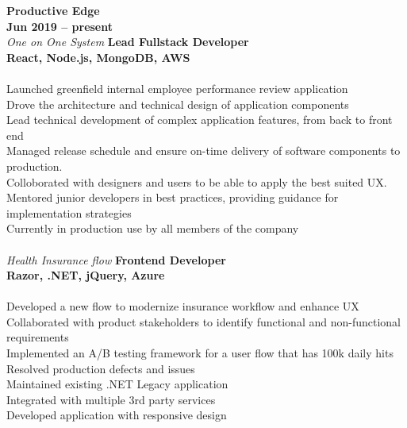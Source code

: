 \documentclass[margin,line]{resume}
\begin{document}
\begin{resume}
    \textbf{\listing Productive Edge} \vspace{2mm}\\\vspace{1mm} \hfill \textbf{Jun 2019 -- present}\\
    \textsl{One on One System}  \hfill \textbf{Lead Fullstack Developer}\\
    \mbox{} \hfill \textbf{React, Node.js, MongoDB, AWS}\\\\
    Launched greenfield internal employee performance review application\\
    Drove the architecture and technical design of application components\\
    Lead technical development of complex application features, from back to front end\\
    Managed release schedule and ensure on-time delivery of software components to production.\\
    Colloborated with designers and users to be able to apply the best suited UX.\\
    Mentored junior developers in best practices, providing guidance for implementation strategies\\
    Currently in production use by all members of the company\\
    \textbf{\listing} \vspace{2mm}\\\vspace{1mm}%
    \textsl{Health Insurance flow}  \hfill \textbf{Frontend Developer}\\
    \mbox{}\hfill \textbf{Razor, .NET, jQuery, Azure}\\\\
    Developed a new flow to modernize insurance workflow and enhance UX\\
    Collaborated with product stakeholders to identify functional and non-functional requirements\\
    Implemented an A/B testing framework for a user flow that has 100k daily hits\\
    Resolved production defects and issues\\
    Maintained existing .NET Legacy application\\
    Integrated with multiple 3rd party services\\ 
    Developed application with responsive design\\
    \textbf{\listing} \vspace{2mm}\\\vspace{1mm}%

\end{resume}
\end{document}
